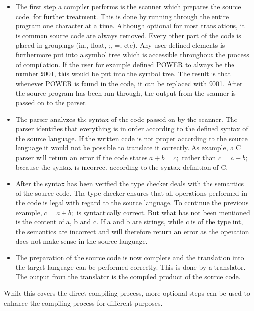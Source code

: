 \begin{itemize}
	\item The first step a compiler performs is the scanner which prepares the source code. for further treatment. This is done by running through the entire program one character at a time. Although optional for most translations, it is common source code are always removed.  Every other part of the code is placed in groupings (int, float, ;, =, etc). Any user defined elements is furthermore put into a symbol tree which is accessible throughout the process of compilation. If the user for example defined POWER to always be the number 9001, this would be put into the symbol tree. The result is that whenever POWER is found in the code, it can be replaced with 9001. After the source program has been run through, the output from the scanner is passed on to the parser.
	
	\item The parser analyzes the syntax of the code passed on by the scanner. The parser identifies that everything is in order according to the defined syntax of the source language. If the written code is not proper according to the source language it would not be possible to translate it correctly. As example, a C parser will return an error if the code states $a + b = c;$ rather than $c = a + b;$ because the syntax is incorrect according to the syntax definition of C.

	\item After the syntax has been verified the type checker deals with the semantics of the source code. The type checker ensures that all operations performed in the code is legal with regard to the source language. To continue the previous example, $c = a + b;$ is syntactically correct. But what has not been mentioned is the content of a, b and c. If a and b are strings, while c is of the type int, the semantics are incorrect and will therefore return an error as the operation does not make sense in the source language.

	\item The preparation of the source code is now complete and the translation into the target language can be performed correctly. This is done by a translator. The output from the translator is the compiled product of the source code.
\end{itemize}

While this covers the direct compiling process, more optional steps can be used to enhance the compiling process for different purposes.

